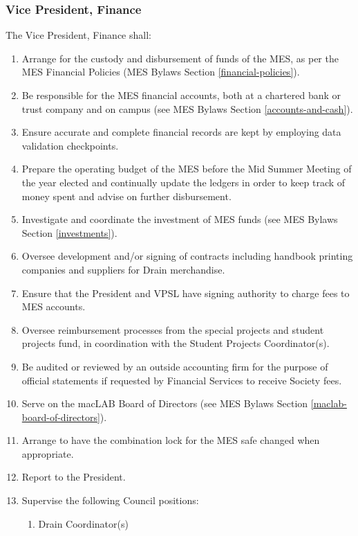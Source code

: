 \subsubsection{Vice President,
 Finance}
\label{vice-president-finance}
The Vice President, Finance shall:

\begin{enumerate}
 \item
  Arrange for the custody and disbursement of funds of the MES, as per the MES Financial Policies (MES Bylaws Section \ref{financial-policies}).
 \item
  Be responsible for the MES financial accounts, both at a chartered bank or trust company and on campus (see MES Bylaws Section \ref{accounts-and-cash}).
 \item
  Ensure accurate and complete financial records are kept by employing data validation checkpoints.
 \item
  Prepare the operating budget of the MES before the Mid Summer Meeting of the year elected and continually update the ledgers in order to keep track of money spent and advise on further disbursement.
 \item
  Investigate and coordinate the investment of MES funds (see MES Bylaws Section \ref{investments}).
 \item
  Oversee development and/or signing of contracts including handbook printing companies and suppliers for Drain merchandise.
 \item
  Ensure that the President and VPSL have signing authority to charge fees to MES accounts.
 \item
  Oversee reimbursement processes from the special projects and student projects fund, in coordination with the Student Projects Coordinator(s).
 \item
  Be audited or reviewed by an outside accounting firm for the purpose of official statements if requested by Financial Services to receive Society fees.
 \item
  Serve on the macLAB Board of Directors (see MES Bylaws Section \ref{maclab-board-of-directors}).
 \item
  Arrange to have the combination lock for the MES safe changed when appropriate.
 \item
  Report to the President.
 \item
  Supervise the following Council positions:

  \begin{enumerate}
   \item
    Drain Coordinator(s)

  \end{enumerate}
\end{enumerate}